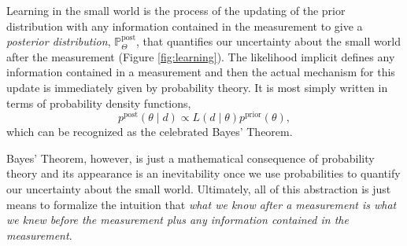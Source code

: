 \documentclass[11pt, oneside]{article}
\newcommand{\PP}{ \mathbb{P} }
\begin{document}
Learning in the small world is the process of the updating of the prior distribution
with any information contained in the measurement to give a \emph{posterior
distribution}, $\PP_{\Theta}^{\mathrm{post}}$, that quantifies our uncertainty
about the small world after the measurement  (Figure \ref{fig:learning}).  The 
likelihood implicit defines any information contained in a measurement and 
then the actual mechanism for this update is immediately given by probability 
theory.  It is most simply written in terms of probability density functions,
%
\begin{equation*}
p^{\mathrm{post}} \! \left( \theta \mid d \right)
\propto
L \! \left( d \mid \theta \right) p^{\mathrm{prior}} \! \left( \theta \right),
\end{equation*}
%
which can be recognized as the celebrated Bayes' Theorem.

Bayes' Theorem, however, is just a mathematical consequence of probability
theory and its appearance is an inevitability once we use probabilities to
quantify our uncertainty about the small world.  Ultimately, all of this
abstraction is just means to formalize the intuition that \emph{what we know 
after a measurement is what we knew before the measurement plus any 
information contained in the measurement}.
\end{document}
